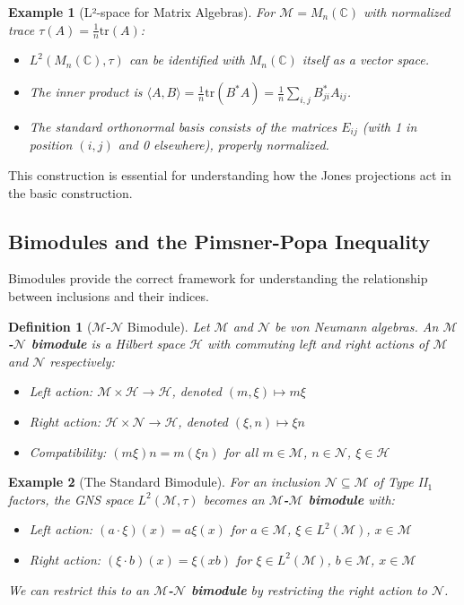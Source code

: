 \documentclass[11pt, a4paper]{article}
\theoremstyle{colored_def}
\newtheorem{definition}{Definition}[section]
\theoremstyle{colored_thm}
\theoremstyle{colored_ex}
\newtheorem{example}{Example}[section]
\newcommand{\C}{\mathbb{C}}
\newcommand{\M}{\mathcal{M}}
\newcommand{\N}{\mathcal{N}}
\newcommand{\Hil}{\mathcal{H}}
\begin{document}
\begin{example}[L²-space for Matrix Algebras]\label{ex:l2-matrix}
For $\M = M_n(\C)$ with normalized trace $\tau(A) = \frac{1}{n}\text{tr}(A)$:

\begin{itemize}
    \item $L^2(M_n(\C), \tau)$ can be identified with $M_n(\C)$ itself as a vector space.
    \item The inner product is $\langle A, B \rangle = \frac{1}{n}\text{tr}(B^*A) = \frac{1}{n}\sum_{i,j} B_{ji}^* A_{ij}$.
    \item The standard orthonormal basis consists of the matrices $E_{ij}$ (with 1 in position $(i,j)$ and 0 elsewhere), properly normalized.
\end{itemize}
\end{example}

This construction is essential for understanding how the Jones projections act in the basic construction.

\subsection{Bimodules and the Pimsner-Popa Inequality}

Bimodules provide the correct framework for understanding the relationship between inclusions and their indices.

\begin{definition}[$\M$-$\N$ Bimodule]
Let $\M$ and $\N$ be von Neumann algebras. An \textbf{$\M$-$\N$ bimodule} is a Hilbert space $\Hil$ with commuting left and right actions of $\M$ and $\N$ respectively:
\begin{itemize}
    \item Left action: $\M \times \Hil \to \Hil$, denoted $(m, \xi) \mapsto m\xi$
    \item Right action: $\Hil \times \N \to \Hil$, denoted $(\xi, n) \mapsto \xi n$
    \item Compatibility: $(m\xi)n = m(\xi n)$ for all $m \in \M$, $n \in \N$, $\xi \in \Hil$
\end{itemize}
\end{definition}

\begin{example}[The Standard Bimodule]\label{ex:standard-bimodule}
For an inclusion $\N \subseteq \M$ of Type II$_1$ factors, the GNS space $L^2(\M, \tau)$ becomes an \textbf{$\M$-$\M$ bimodule} with:
\begin{itemize}
    \item Left action: $(a \cdot \xi)(x) = a\xi(x)$ for $a \in \M$, $\xi \in L^2(\M)$, $x \in \M$
    \item Right action: $(\xi \cdot b)(x) = \xi(xb)$ for $\xi \in L^2(\M)$, $b \in \M$, $x \in \M$
\end{itemize}

We can restrict this to an \textbf{$\M$-$\N$ bimodule} by restricting the right action to $\N$.
\end{example}
\end{document}
